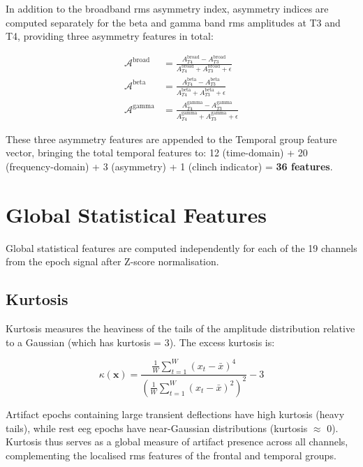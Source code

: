 In addition to the broadband \acrshort{rms} asymmetry index,
asymmetry indices are computed separately for the beta and
gamma band \acrshort{rms} amplitudes at T3 and T4, providing
three asymmetry features in total:

\begin{align}
\mathcal{A}^{\text{broad}} &= \frac{A_{T4}^{\text{broad}}
- A_{T3}^{\text{broad}}}{A_{T4}^{\text{broad}}
+ A_{T3}^{\text{broad}} + \epsilon} \\
\mathcal{A}^{\text{beta}} &= \frac{A_{T4}^{\text{beta}}
- A_{T3}^{\text{beta}}}{A_{T4}^{\text{beta}}
+ A_{T3}^{\text{beta}} + \epsilon} \\
\mathcal{A}^{\text{gamma}} &= \frac{A_{T4}^{\text{gamma}}
- A_{T3}^{\text{gamma}}}{A_{T4}^{\text{gamma}}
+ A_{T3}^{\text{gamma}} + \epsilon}
\end{align}

These three asymmetry features are appended to the Temporal
group feature vector, bringing the total temporal features to:
12 (time-domain) + 20 (frequency-domain) + 3 (asymmetry)
+ 1 (clinch indicator) = \textbf{36 features}.

\section{Global Statistical Features}
\label{sec:fe_global}

Global statistical features are computed independently for
each of the 19 channels from the epoch signal after
Z-score normalisation.

\subsection{Kurtosis}

Kurtosis measures the heaviness of the tails of the
amplitude distribution relative to a Gaussian (which has
kurtosis = 3). The excess kurtosis is:

\begin{equation}
\kappa(\mathbf{x}) = \frac{\frac{1}{W}\sum_{t=1}^{W}
(x_t - \bar{x})^4}{\left(\frac{1}{W}\sum_{t=1}^{W}
(x_t - \bar{x})^2\right)^2} - 3
\label{eq:kurtosis}
\end{equation}

Artifact epochs containing large transient deflections have
high kurtosis (heavy tails), while rest \acrshort{eeg}
epochs have near-Gaussian distributions (kurtosis
$\approx$ 0). Kurtosis thus serves as a global measure of
artifact presence across all channels, complementing the
localised \acrshort{rms} features of the frontal and
temporal groups.

